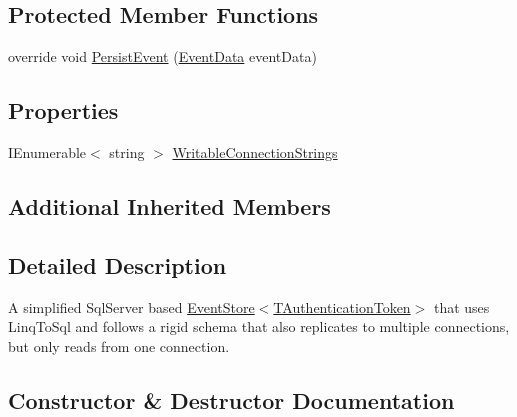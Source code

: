 \subsection*{Protected Member Functions}
\begin{DoxyCompactItemize}
\item 
override void \hyperlink{classCqrs_1_1Sql_1_1Events_1_1ReplicatedSqlEventStore_a51c9b1329327e456a251aa2d910fc7ae_a51c9b1329327e456a251aa2d910fc7ae}{Persist\+Event} (\hyperlink{classCqrs_1_1Events_1_1EventData}{Event\+Data} event\+Data)
\end{DoxyCompactItemize}
\subsection*{Properties}
\begin{DoxyCompactItemize}
\item 
I\+Enumerable$<$ string $>$ \hyperlink{classCqrs_1_1Sql_1_1Events_1_1ReplicatedSqlEventStore_af7275b09a11b2c7da447019636a5e0f9_af7275b09a11b2c7da447019636a5e0f9}{Writable\+Connection\+Strings}
\end{DoxyCompactItemize}
\subsection*{Additional Inherited Members}


\subsection{Detailed Description}
A simplified Sql\+Server based \hyperlink{classCqrs_1_1Events_1_1EventStore_a6346cb2aea4c5b4e740dc6cfb15abab8_a6346cb2aea4c5b4e740dc6cfb15abab8}{Event\+Store$<$\+T\+Authentication\+Token$>$} that uses Linq\+To\+Sql and follows a rigid schema that also replicates to multiple connections, but only reads from one connection. 



\subsection{Constructor \& Destructor Documentation}
\mbox{\label{classCqrs_1_1Sql_1_1Events_1_1ReplicatedSqlEventStore_aa00d17e2b147ebf7d2aff5ef1a543c07_aa00d17e2b147ebf7d2aff5ef1a543c07}} 
